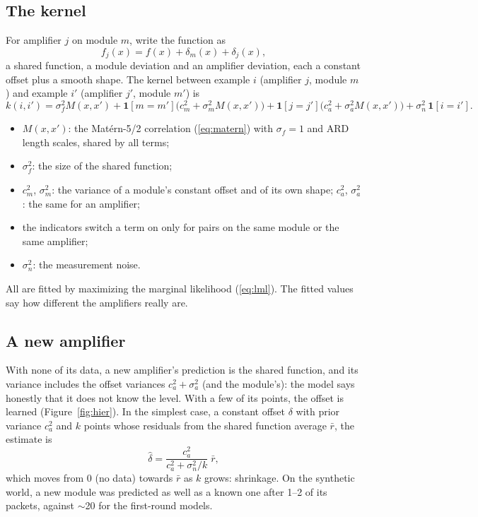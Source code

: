 \documentclass[11pt]{article}
\newcommand{\ind}{\mathbf{1}}
\begin{document}
\subsection{The kernel}
For amplifier $j$ on module $m$, write the function as
\begin{equation}
f_j(x) = f(x) + \delta_m(x) + \delta_j(x),
\end{equation}
a shared function, a module deviation and an amplifier deviation, each a constant offset plus a smooth shape. The kernel between
example $i$ (amplifier $j$, module $m$) and example $i'$ (amplifier $j'$, module $m'$) is
\begin{equation}
k(i, i') = \sigma_f^2 M(x, x') + \ind[m = m']\bigl(c_m^2 + \sigma_m^2 M(x, x')\bigr) + \ind[j = j']\bigl(c_a^2 + \sigma_a^2 M(x, x')\bigr) + \sigma_n^2\,\ind[i = i'] .
\end{equation}
\begin{itemize}
\item $M(x, x')$: the Mat\'ern-5/2 correlation (\ref{eq:matern}) with $\sigma_f = 1$ and ARD length scales, shared by all terms;
\item $\sigma_f^2$: the size of the shared function;
\item $c_m^2$, $\sigma_m^2$: the variance of a module's constant offset and of its own shape; $c_a^2$, $\sigma_a^2$: the same for
  an amplifier;
\item the indicators switch a term on only for pairs on the same module or the same amplifier;
\item $\sigma_n^2$: the measurement noise.
\end{itemize}
All are fitted by maximizing the marginal likelihood (\ref{eq:lml}). The fitted values say how different the amplifiers really are.

\subsection{A new amplifier}
With none of its data, a new amplifier's prediction is the shared function, and its variance includes the offset variances
$c_a^2 + \sigma_a^2$ (and the module's): the model says honestly that it does not know the level. With a few of its points, the
offset is learned (Figure~\ref{fig:hier}). In the simplest case, a constant offset $\delta$ with prior variance $c_a^2$ and $k$
points whose residuals from the shared function average $\bar r$, the estimate is
\begin{equation}
\hat\delta = \frac{c_a^2}{c_a^2 + \sigma_n^2/k}\;\bar r ,
\end{equation}
which moves from 0 (no data) towards $\bar r$ as $k$ grows: shrinkage. On the synthetic world, a new module was predicted as well as
a known one after 1--2 of its packets, against $\sim$20 for the first-round models.
\end{document}
